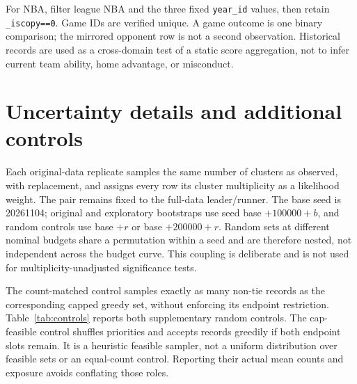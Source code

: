 For NBA, filter league NBA and the three fixed \texttt{year\_id} values, then retain \texttt{\_iscopy==0}. Game IDs are verified unique. A game outcome is one binary comparison; the mirrored opponent row is not a second observation. Historical records are used as a cross-domain test of a static score aggregation, not to infer current team ability, home advantage, or misconduct.

\section{Uncertainty details and additional controls}\label{app:uncertainty}
Each original-data replicate samples the same number of clusters as observed, with replacement, and assigns every row its cluster multiplicity as a likelihood weight. The pair remains fixed to the full-data leader/runner. The base seed is 20261104; original and exploratory bootstraps use seed base $+100000+b$, and random controls use base $+r$ or base $+200000+r$. Random sets at different nominal budgets share a permutation within a seed and are therefore nested, not independent across the budget curve. This coupling is deliberate and is not used for multiplicity-unadjusted significance tests.

\begin{table}[h]
\centering\small
\caption{Uncertainty at nominal 1\% on full cohorts. $s_0$: original margin SD. Win retention: original leader remains first under cluster bootstrap. Flip: random-subset pair-reversal frequency with Wilson 95\% interval (100 draws). Last column: empirical 2.5--97.5\% random edited-margin range, not an interval for an estimated mean.}\label{tab:uncertainty}


\end{table}

The count-matched control samples exactly as many non-tie records as the corresponding capped greedy set, without enforcing its endpoint restriction. Table~\ref{tab:controls} reports both supplementary random controls. The cap-feasible control shuffles priorities and accepts records greedily if both endpoint slots remain. It is a heuristic feasible sampler, not a uniform distribution over feasible sets or an equal-count control. Reporting their actual mean counts and exposure avoids conflating those roles.

\begin{table}[h]
\centering\small
\caption{Supplementary random controls at nominal 1\%. $D$ uses the same original SD as the primary analysis. Cap-feasible draws can underfill; count-matched draws need not satisfy the caps.}\label{tab:controls}


\end{table}

